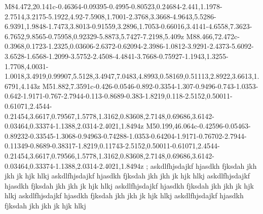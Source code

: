 \documentclass[12pt]{exam}
\begin{document}
{{{{M84.472,20.141c-0.46364-0.09395-0.4995-0.80523,0.24684-2.441,1.1978-2.7514,3.2175-5.1922,4.92-7.5908,1.7001-2.3768,3.3668-4.9643,5.5286-6.9391,1.9848-1.7473,3.8013-0.91559,3.2896,1.7053-0.66016,3.4141-4.6558,7.3623-6.7652,9.8565-0.75958,0.92329-5.8873,5.7427-7.2198,5.409z
M88.466,72.472c-0.3968,0.1723-1.2325,0.03606-2.6372-0.62094-2.3986-1.0812-3.9291-2.4373-5.6092-3.6528-1.6568-1.2099-3.5752-2.4508-4.4841-3.7668-0.75927-1.1943,1.3255-1.7708,4.0031-1.0018,3.4919,0.99907,5.5128,3.4947,7.0483,4.8993,0.58169,0.51113,2.8922,3.6613,1.6791,4.143z
M51.882,7.3591c-0.426-0.0546-0.892-0.3354-1.307-0.9496-0.743-1.0353-0.642-1.9171-0.767-2.7944-0.113-0.8689-0.383-1.8219,0.118-2.5152,0.50011-0.61071,2.4544-0.21454,3.6617,0.79567,1.5778,1.3162,0.83608,2.7148,0.69686,3.6142-0.03464,0.33374-1.1388,2.0314-2.4021,1.8494z
M50.199,46.064c-0.42596-0.05463-0.89232-0.33545-1.3068-0.94963-0.74288-1.0353-0.64204-1.9171-0.76702-2.7944-0.11349-0.8689-0.38317-1.8219,0.11743-2.5152,0.50011-0.61071,2.4544-0.21454,3.6617,0.79566,1.5778,1.3162,0.83608,2.7148,0.69686,3.6142-0.03464,0.33374-1.1388,2.0314-2.4021,1.8494z
};}}}
 askdlfhjsdajkf hjasdkh fjksdah jkh jkh jk hjk hlkj askdlfhjsdajkf hjasdkh fjksdah jkh jkh jk hjk hlkj askdlfhjsdajkf hjasdkh fjksdah jkh jkh jk hjk hlkj askdlfhjsdajkf hjasdkh fjksdah jkh jkh jk hjk hlkj askdlfhjsdajkf hjasdkh fjksdah jkh jkh jk hjk hlkj askdlfhjsdajkf hjasdkh fjksdah jkh jkh jk hjk hlkj 

\vspace{3em}
\end{document}
